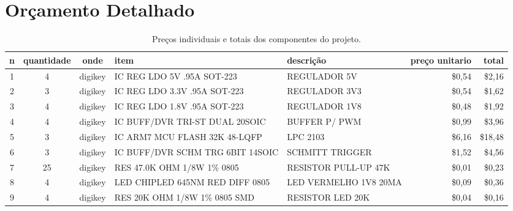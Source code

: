 \chapter{Or\c{c}amento Detalhado}

\begin{table}[!h]\tiny
  \centering
  \caption{Pre\c{c}os individuais e totais dos componentes do projeto.}
    \begin{tabular}{crrrrrr}
    \toprule
    n     & \multicolumn{1}{c}{quantidade} & \multicolumn{1}{c}{onde} & \multicolumn{1}{l}{item} & \multicolumn{1}{l}{descrição} & preço unitario & total \\
    \midrule
    1     & \multicolumn{1}{c}{4} & \multicolumn{1}{c}{digikey} & \multicolumn{1}{l}{IC REG LDO 5V .95A SOT-223} & \multicolumn{1}{l}{REGULADOR 5V} & \$0,54 & \$2,16 \\
    2     & \multicolumn{1}{c}{3} & \multicolumn{1}{c}{digikey} & \multicolumn{1}{l}{IC REG LDO 3.3V .95A SOT-223} & \multicolumn{1}{l}{REGULADOR 3V3} & \$0,54 & \$1,62 \\
    3     & \multicolumn{1}{c}{4} & \multicolumn{1}{c}{digikey} & \multicolumn{1}{l}{IC REG LDO 1.8V .95A SOT-223} & \multicolumn{1}{l}{REGULADOR 1V8} & \$0,48 & \$1,92 \\
    4     & \multicolumn{1}{c}{4} & \multicolumn{1}{c}{digikey} & \multicolumn{1}{l}{IC BUFF/DVR TRI-ST DUAL 20SOIC} & \multicolumn{1}{l}{BUFFER P/ PWM} & \$0,99 & \$3,96 \\
    5     & \multicolumn{1}{c}{3} & \multicolumn{1}{c}{digikey} & \multicolumn{1}{l}{IC ARM7 MCU FLASH 32K 48-LQFP} & \multicolumn{1}{l}{LPC 2103} & \$6,16 & \$18,48 \\
    6     & \multicolumn{1}{c}{3} & \multicolumn{1}{c}{digikey} & \multicolumn{1}{l}{IC BUFF/DVR SCHM TRG 6BIT 14SOIC} & \multicolumn{1}{l}{SCHMITT TRIGGER} & \$1,52 & \$4,56 \\
    7     & \multicolumn{1}{c}{25} & \multicolumn{1}{c}{digikey} & \multicolumn{1}{l}{RES 47.0K OHM 1/8W 1\% 0805} & \multicolumn{1}{l}{RESISTOR PULL-UP 47K} & \$0,01 & \$0,23 \\
    8     & \multicolumn{1}{c}{4} & \multicolumn{1}{c}{digikey} & \multicolumn{1}{l}{LED CHIPLED 645NM RED DIFF 0805} & \multicolumn{1}{l}{LED VERMELHO 1V8 20MA} & \$0,09 & \$0,36 \\
    9     & \multicolumn{1}{c}{4} & \multicolumn{1}{c}{digikey} & \multicolumn{1}{l}{RES 20K OHM 1/8W 1\% 0805 SMD} & \multicolumn{1}{l}{RESISTOR LED 20K} & \$0,04 & \$0,16 \\

\end{tabular}
\end{table}
